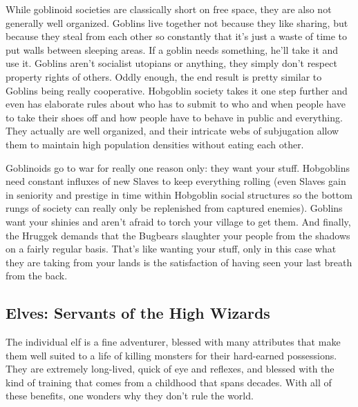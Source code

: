 While goblinoid societies are classically short on free space, they are also not generally well organized. Goblins live together not because they like sharing, but because they steal from each other so constantly that it's just a waste of time to put walls between sleeping areas. If a goblin needs something, he'll take it and use it. Goblins aren't socialist utopians or anything, they simply don't respect property rights of others. Oddly enough, the end result is pretty similar to Goblins being really cooperative. Hobgoblin society takes it one step further and even has elaborate rules about who has to submit to who and when people have to take their shoes off and how people have to behave in public and everything. They actually are well organized, and their intricate webs of subjugation allow them to maintain high population densities without eating each other.

Goblinoids go to war for really one reason only: they want your stuff. Hobgoblins need constant influxes of new Slaves to keep everything rolling (even Slaves gain in seniority and prestige in time within Hobgoblin social structures so the bottom rungs of society can really only be replenished from captured enemies). Goblins want your shinies and aren't afraid to torch your village to get them. And finally, the Hruggek demands that the Bugbears slaughter your people from the shadows on a fairly regular basis. That's like wanting your stuff, only in this case what they are taking from your lands is the satisfaction of having seen your last breath from the back.

\subsection{Elves: Servants of the High Wizards}

The individual elf is a fine adventurer, blessed with many attributes that make them well suited to a life of killing monsters for their hard-earned possessions. They are extremely long-lived, quick of eye and reflexes, and blessed with the kind of training that comes from a childhood that spans decades. With all of these benefits, one wonders why they don't rule the world.

